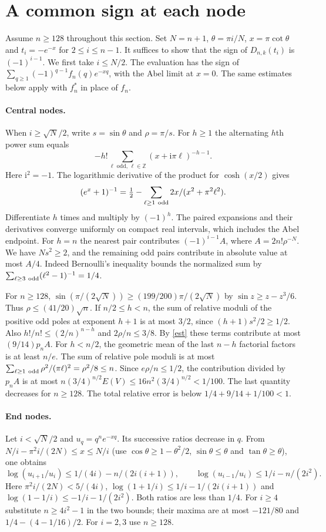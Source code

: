 \documentclass[11pt]{article}
\begin{document}
\section{A common sign at each node}
Assume $n\ge128$ throughout this section. Set $N=n+1$, $\theta=\pi i/N$, $x=\pi\cot\theta$ and $t_i=-e^{-x}$ for $2\le i\le n-1$. It suffices to show that the sign of $D_{n,k}(t_i)$ is $(-1)^{i-1}$. We first take $i\le N/2$. The evaluation has the sign of
$\sum_{q\ge1}(-1)^{q-1}f_n(q)e^{-xq}$, with the Abel limit at $x=0$. The same estimates below apply with $f_n^*$ in place of $f_n$.

\paragraph{Central nodes.}
When $i\ge\sqrt N/2$, write $s=\sin\theta$ and $\rho=\pi/s$. For $h\ge1$ the alternating $h$th power sum equals
\[
 -h!\sum_{\ell\text{ odd},\,\ell\in\mathbb Z}(x+\mathrm i\pi\ell)^{-h-1}.
\]
Here $\mathrm i^2=-1$. The logarithmic derivative of the product for $\cosh(x/2)$ gives
\[
 (e^x+1)^{-1}=\tfrac12-\sum_{\ell\ge1\ {\rm odd}}2x/(x^2+\pi^2\ell^2).
\]
Differentiate $h$ times and multiply by $(-1)^h$. The paired expansions and their derivatives converge uniformly on compact real intervals, which includes the Abel endpoint.
For $h=n$ the nearest pair contributes $(-1)^{i-1}A$, where $A=2n!\rho^{-N}$. We have $Ns^2\ge2$, and the remaining odd pairs contribute in absolute value at most $A/4$. Indeed Bernoulli's inequality bounds the normalized sum by $\sum_{\ell\ge3\ {\rm odd}}(\ell^2-1)^{-1}=1/4$.

For $n\ge128$, $\sin(\pi/(2\sqrt N))\ge(199/200)\pi/(2\sqrt N)$ by $\sin z\ge z-z^3/6$. Thus $\rho\le(41/20)\sqrt n$. If $n/2\le h<n$, the sum of relative moduli of the positive odd poles at exponent $h+1$ is at most $3/2$, since $(h+1)s^2/2\ge1/2$. Also $h!/n!\le(2/n)^{n-h}$ and $2\rho/n\le3/8$. By \eqref{est} these terms contribute at most $(9/14)p_nA$. For $h<n/2$, the geometric mean of the last $n-h$ factorial factors is at least $n/e$. The sum of relative pole moduli is at most $\sum_{\ell\ge1\ {\rm odd}}\rho^2/(\pi\ell)^2=\rho^2/8\le n$. Since $e\rho/n\le1/2$, the contribution divided by $p_n A$ is at most
$n(3/4)^{n/2}E(V)\le16n^2(3/4)^{n/2}<1/100$. The last quantity decreases for $n\ge128$. The total relative error is below $1/4+9/14+1/100<1$.

\paragraph{End nodes.}
Let $i<\sqrt N/2$ and $u_q=q^n e^{-xq}$. Its successive ratios decrease in $q$. From
$N/i-\pi^2 i/(2N)\le x\le N/i$ (use $\cos\theta\ge1-\theta^2/2$, $\sin\theta\le\theta$ and $\tan\theta\ge\theta$), one obtains
\[
 \log(u_{i+1}/u_i)\le 1/(4i)-n/(2i(i+1)),\qquad
 \log(u_{i-1}/u_i)\le 1/i-n/(2i^2).
\]
Here $\pi^2 i/(2N)<5/(4i)$, $\log(1+1/i)\le1/i-1/(2i(i+1))$ and $\log(1-1/i)\le-1/i-1/(2i^2)$. Both ratios are less than $1/4$. For $i\ge4$ substitute $n\ge4i^2-1$ in the two bounds; their maxima are at most $-121/80$ and $1/4-(4-1/16)/2$. For $i=2,3$ use $n\ge128$.
\end{document}
